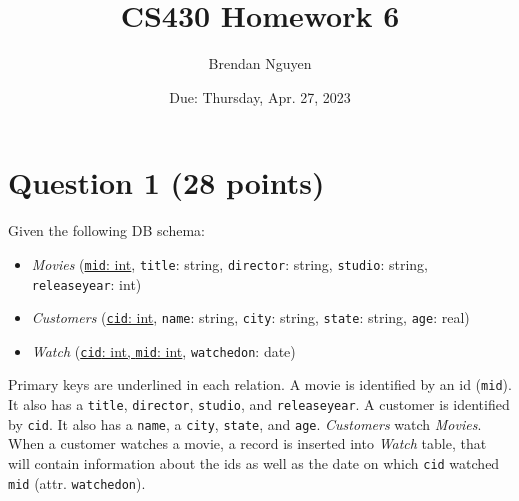 \documentclass[letterpaper, 11pt]{article}
\title{CS430 Homework 6}
\author{Brendan Nguyen}
\date{Due: Thursday, Apr. 27, 2023}
\begin{document}
\maketitle

\section*{Question 1 (28 points)}

Given the following DB schema:
\begin{itemize}
    \item \textit{Movies} (\underline{\texttt{mid}: int}, \texttt{title}: string, \texttt{director}: string, \texttt{studio}: string, \texttt{releaseyear}: int)
    \item \textit{Customers} (\underline{\texttt{cid}: int}, \texttt{name}: string, \texttt{city}: string, \texttt{state}: string, \texttt{age}: real)
    \item \textit{Watch} (\underline{\texttt{cid}: int, \texttt{mid}: int}, \texttt{watchedon}: date)
\end{itemize}

Primary keys are underlined in each relation. A movie is identified by an id (\texttt{mid}). It also has a \texttt{title}, \texttt{director}, \texttt{studio}, and \texttt{releaseyear}. A customer is identified by \texttt{cid}. It also has a \texttt{name}, a \texttt{city}, \texttt{state}, and \texttt{age}. \textit{Customers} watch \textit{Movies}. When a customer watches a movie, a record is inserted into \textit{Watch} table, that will contain information about the ids as well as the date on which \texttt{cid} watched \texttt{mid} (attr. \texttt{watchedon}).
\end{document}
